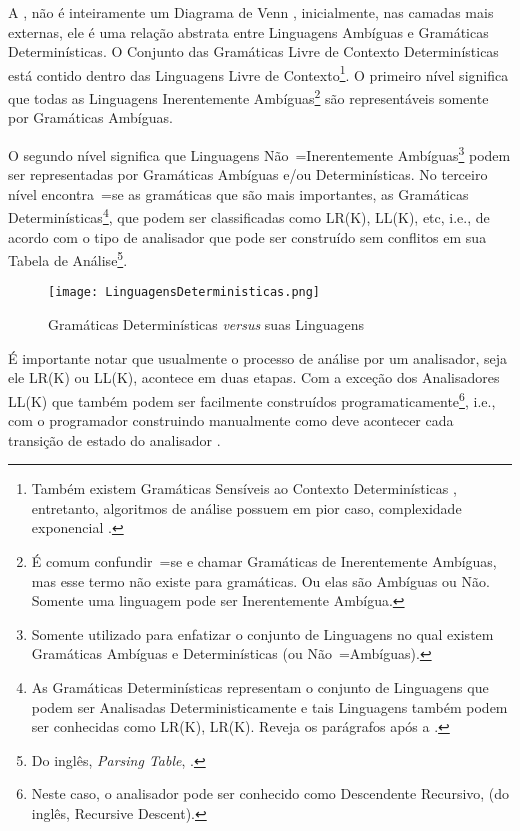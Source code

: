 A ,
não é inteiramente um Diagrama de Venn \cite{generalizedVennDiagrams},
inicialmente,
nas camadas mais externas,
ele é uma relação abstrata entre Linguagens Ambíguas e
Gramáticas Determinísticas.
O Conjunto das Gramáticas Livre de Contexto Determinísticas está contido dentro das Linguagens Livre de Contexto\footnote{
Também existem Gramáticas Sensíveis ao Contexto Determinísticas \cite{contextSensitiveParsing},
entretanto,
algoritmos de análise possuem em pior caso,
complexidade exponencial \cite{areContextSensitiveGrammarWithPolynomialTime}.
}.
O primeiro nível significa que todas as Linguagens Inerentemente Ambíguas\footnote{
É comum confundir~=se e
chamar Gramáticas de Inerentemente Ambíguas,
mas esse termo não existe para gramáticas.
Ou elas são Ambíguas ou
Não.
Somente uma linguagem pode ser Inerentemente Ambígua.
}
são representáveis somente por Gramáticas Ambíguas.

O segundo nível significa que Linguagens Não~=Inerentemente Ambíguas\footnote{
Somente utilizado para enfatizar o conjunto de Linguagens no qual existem Gramáticas Ambíguas e
Determinísticas (ou Não~=Ambíguas).
}
podem ser representadas por Gramáticas Ambíguas e\slash{}ou Determinísticas.
No terceiro nível encontra~=se as gramáticas que são mais importantes,
as Gramáticas Determinísticas\footnote{
As Gramáticas Determinísticas representam o conjunto de Linguagens que podem ser Analisadas Deterministicamente e
tais Linguagens também podem ser conhecidas como LR(K),
LR(K).
Reveja os parágrafos após a .
},
que podem ser classificadas como LR(K),
LL(K), etc, i.e.,
de acordo com o tipo de analisador que pode ser construído sem conflitos em sua Tabela de Análise\footnote{
Do inglês, \textit{Parsing Table},
\cite{ahoCompilerDragonBook}.
}.
\begin{figure}[!htb]
\caption{Gramáticas Determinísticas \textit{versus} suas Linguagens}
\label{LinguagensDeterministicas}
\centering
\texttt{[image: LinguagensDeterministicas.png]}
\end{figure}

É importante notar que usualmente o processo de análise por um analisador,
seja ele LR(K) ou
LL(K),
acontece em duas etapas.
Com a exceção dos Analisadores LL(K) que também podem ser facilmente construídos programaticamente\footnote{
Neste caso,
o analisador pode ser conhecido como Descendente Recursivo,
(do inglês,
Recursive Descent).
},
i.e.,
com o programador construindo manualmente como deve acontecer cada transição de estado do analisador \cite{ahoCompilerDragonBook}.

